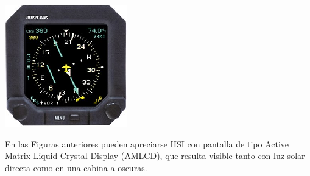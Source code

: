 \begin{minipage}[c]{0.45\textwidth}
  \begin{center}
  \includegraphics[width=0.9\linewidth]{06.radionavegacion/Imagenes/06.02.vor.imagenes/hsi-Bendix-King-KI-825.eps}
  \label{fig:HSI_002}    
\end{center}
\end{minipage}




En las Figuras anteriores pueden apreciarse HSI con pantalla de tipo Active Matrix Liquid Crystal Display (AMLCD), que resulta visible tanto con luz solar directa como en una cabina a oscuras.

